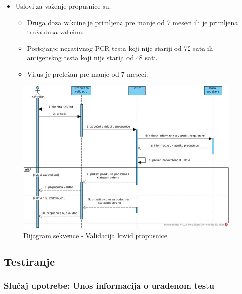 \documentclass[titlepage]{article}
\begin{document}
\begin{itemize}
        \begin{itemize}
            \item Uslovi za važenje propusnice su:
                \begin{itemize}
                    \item Druga doza vakcine je primljena pre manje od 7 meseci ili  je primljena treća doza vakcine.
                    \item Postojanje negativnog PCR testa koji nije stariji od 72 sata ili antigenskog testa koji nije stariji od 48 sati.
                    \item Virus je preležan pre manje od 7 meseci.
                \end{itemize}
        \end{itemize}
\end{itemize}

\begin{figure}[H]
\centering
\includegraphics[scale=0.5]{Validacija_propusnice}
\caption{Dijagram sekvence - Validacija kovid propusnice}
\label{slk:validacija}
\end{figure}

\subsection{Testiranje}

\subsubsection{Slučaj upotrebe: Unos informacija o urađenom testu}
\end{document}
